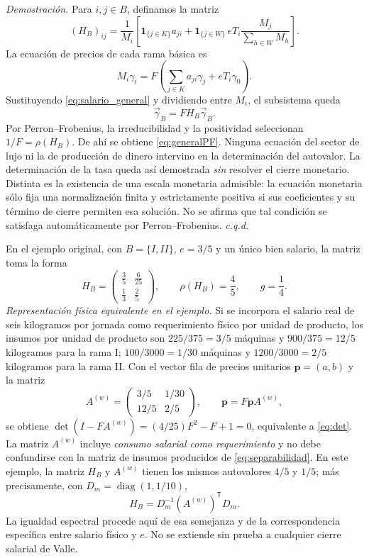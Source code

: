 \documentclass[10pt,twoside]{article}
\begin{document}
\noindent\textit{Demostración.} Para $i,j\in B$, definamos la matriz
\begin{equation}
(H_B)_{ij}=\frac{1}{M_i}\left[
\mathbf{1}_{\{j\in K\}}a_{ji}+
\mathbf{1}_{\{j\in W\}}\,eT_i
\frac{M_j}{\sum_{h\in W}M_h}\right].\label{eq:Hgeneral}
\end{equation}
La ecuación de precios de cada rama básica es
\[
M_i\gamma_i=F\left(\sum_{j\in K}a_{ji}\gamma_j+eT_i\gamma_0\right).
\]
Sustituyendo \eqref{eq:salario_general} y dividiendo entre $M_i$, el subsistema queda
\begin{equation}
\vec{\gamma}_B=F H_B\vec{\gamma}_B.\label{eq:PF}
\end{equation}
Por Perron--Frobenius, la irreducibilidad y la positividad seleccionan $1/F=\rho(H_B)$. De ahí se obtiene \eqref{eq:generalPF}. Ninguna ecuación del sector de lujo ni la de producción de dinero intervino en la determinación del autovalor. La determinación de la tasa queda así demostrada \emph{sin} resolver el cierre monetario. Distinta es la existencia de una escala monetaria admisible: la ecuación monetaria sólo fija una normalización finita y estrictamente positiva si sus coeficientes y su término de cierre permiten esa solución. No se afirma que tal condición se satisfaga automáticamente por Perron--Frobenius. \hfill\textit{c.q.d.}

En el ejemplo original, con $B=\{I,II\}$, $e=3/5$ y un único bien salario, la matriz toma la forma
\begin{equation}
H_B=\begin{pmatrix}
\frac35 & \frac6{25}\\[2pt]
\frac13 & \frac25
\end{pmatrix},\qquad
\rho(H_B)=\frac45,\qquad g=\frac14.
\label{eq:PF_num}
\end{equation}
\noindent\textit{Representación física equivalente en el ejemplo.} Si se incorpora el salario real de seis kilogramos por jornada como requerimiento físico por unidad de producto, los insumos por unidad de producto son $225/375=3/5$ máquinas y $900/375=12/5$ kilogramos para la rama I; $100/3000=1/30$ máquinas y $1200/3000=2/5$ kilogramos para la rama II. Con el vector fila de precios unitarios $\mathbf p=(a,b)$ y la matriz
\[
A^{(w)}=\begin{pmatrix}3/5&1/30\\[2pt]12/5&2/5\end{pmatrix},
\qquad \mathbf p=F\mathbf p A^{(w)},
\]
se obtiene $\det(I-FA^{(w)})=(4/25)F^2-F+1=0$, equivalente a \eqref{eq:det}. La matriz $A^{(w)}$ incluye \emph{consumo salarial como requerimiento} y no debe confundirse con la matriz de insumos producidos de \eqref{eq:separabilidad}. En este ejemplo, la matriz $H_B$ y $A^{(w)}$ tienen los mismos autovalores $4/5$ y $1/5$; más precisamente, con $D_m=\operatorname{diag}(1,1/10)$,
\[
H_B=D_m^{-1}(A^{(w)})^{\mathsf T}D_m.
\]
La igualdad espectral procede aquí de esa semejanza y de la correspondencia específica entre salario físico y $e$. No se extiende sin prueba a cualquier cierre salarial de Valle.
\end{document}
